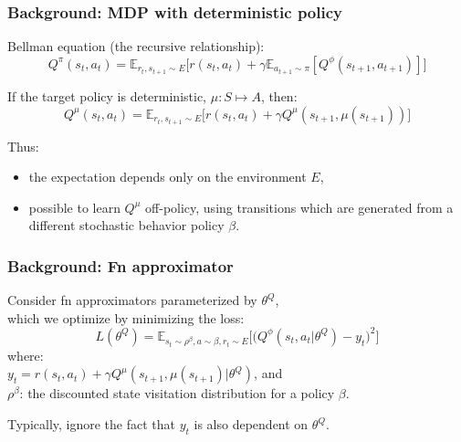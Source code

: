 \begin{frame}
\frametitle{Background: MDP with deterministic policy}
Bellman equation (the recursive relationship):
\begin{equation}
Q^{\pi} (s_t,a_t) = \mathbb{E}_{r_{t},s_{t+1} \sim E} \Big[ r(s_t,a_t) + \gamma \mathbb{E}_{a_{t+1} \sim \pi} [Q^{\phi}(s_{t+1},a_{t+1})] \Big]
\end{equation}

If the target policy is deterministic, $\mu: S \mapsto A$, then:
\begin{equation}
Q^{\mu} (s_t,a_t) = \mathbb{E}_{r_{t},s_{t+1} \sim E} \Big[ r(s_t,a_t) + \gamma Q^{\mu}(s_{t+1},\mu(s_{t+1})) \Big]
\end{equation}

Thus:
\begin{itemize}
\item the expectation depends only on the environment $E$,
\item possible to learn $Q^{\mu}$ off-policy, using transitions which
are generated from a different stochastic behavior policy $\beta$.
\end{itemize}
\end{frame}

\begin{frame}
\frametitle{Background: Fn approximator}
Consider fn approximators parameterized by $\theta^Q$, \\
which we optimize by minimizing the loss:
\begin{equation} \label{equ:qloss}
L(\theta^Q) =\mathbb{E}_{s_t \sim \rho^{\beta}, a \sim \beta, r_t \sim E} \Big[ \Big( Q^{\phi} (s_t,a_t|\theta^Q) - y_t \Big)^2 \Big]
\end{equation}
where:\\
$y_t = r(s_t,a_t) + \gamma Q^{\mu}(s_{t+1},\mu(s_{t+1}) | \theta^Q)$, and \\
$\rho^{\beta}$: the discounted state visitation distribution for a policy $\beta$.
\vspace{5mm}

Typically, ignore the fact that $y_t$ is also dependent on $\theta^Q$.\\
\end{frame}


